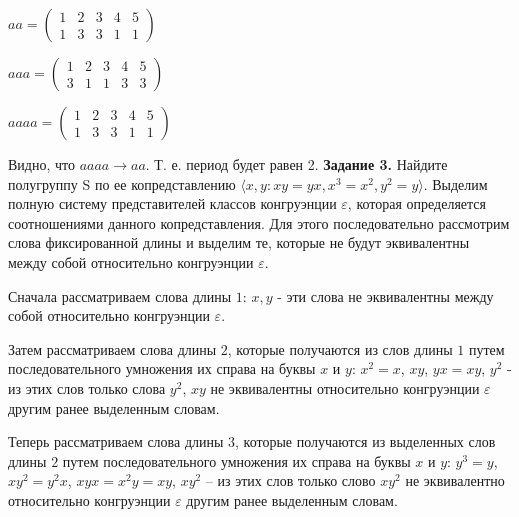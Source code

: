 \documentclass[spec, och, labwork]{shiza}
\begin{document}
      \begin{center}
        $aa = \begin{pmatrix}
          1 & 2 & 3 & 4 & 5\\
          1 & 3 & 3 & 1 & 1
      \end{pmatrix}$
      \end{center}

      \begin{center}
        $aaa = \begin{pmatrix}
          1 & 2 & 3 & 4 & 5\\
          3 & 1 & 1 & 3 & 3
      \end{pmatrix}$
      \end{center}

      \begin{center}
        $aaaa = \begin{pmatrix}
          1 & 2 & 3 & 4 & 5\\
          1 & 3 & 3 & 1 & 1
      \end{pmatrix}$
      \end{center}

        Видно, что $aaaa \rightarrow aa$. Т. е. период будет равен 2.
        \textbf{Задание 3.} Найдите полугруппу S по ее копредставлению $\langle x, y : xy = yx, x^3 = x^2, y^2 = y
        \rangle$. Выделим полную систему представителей классов конгруэнции $\varepsilon$, которая определяется
        соотношениями данного копредставления. Для этого последовательно рассмотрим слова фиксированной длины и выделим
        те, которые не будут эквивалентны между собой относительно конгруэнции $\varepsilon$.

        Сначала рассматриваем слова длины $1$: $x, y$ - эти слова не эквивалентны между собой относительно конгруэнции
        $\varepsilon$.

        Затем рассматриваем слова длины $2$, которые получаются из слов длины $1$ путем последовательного умножения их
        справа на буквы $x$ и $y$: $x^2 = x$, $xy$, $yx = xy$, $y^2$ - из этих слов только слова $y^2$, $xy$ не
        эквивалентны относительно конгруэнции $\varepsilon$ другим ранее выделенным словам.

        Теперь рассматриваем слова длины $3$, которые получаются из выделенных слов длины $2$ путем последовательного
        умножения их справа на буквы $x$ и $y$: $y^3 = y$, $xy^2 = y^2x$, $xyx = x^2y = xy$, $xy^2$ – из этих слов только
        слово $xy^2$ не эквивалентно относительно конгруэнции $\varepsilon$ другим ранее выделенным словам.
\end{document}
